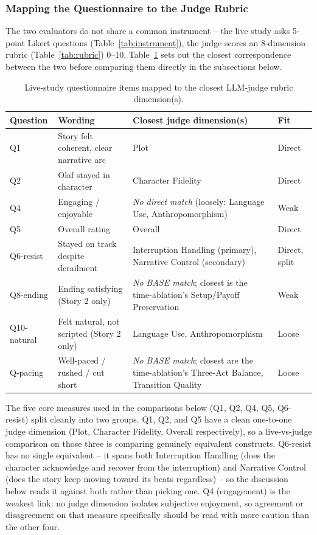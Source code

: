 \documentclass[10pt]{article}
\begin{document}
\subsubsection{Mapping the Questionnaire to the Judge Rubric}
\label{sec:llm-vs-study-mapping}

The two evaluators do not share a common instrument -- the live study asks 5-point Likert questions (Table~\ref{tab:instrument}), the judge scores an 8-dimension rubric (Table~\ref{tab:rubric}) 0--10. Table~\ref{tab:question-mapping} sets out the closest correspondence between the two before comparing them directly in the subsections below.

\begin{table}[htbp]
\centering
\caption{Live-study questionnaire items mapped to the closest LLM-judge rubric dimension(s).}
\label{tab:question-mapping}
\small
\begin{tabular}{p{2.4cm}p{5.6cm}p{4.3cm}p{1.6cm}}
\toprule
Question & Wording & Closest judge dimension(s) & Fit \\
\midrule
Q1 & Story felt coherent, clear narrative arc & Plot & Direct \\
Q2 & Olaf stayed in character & Character Fidelity & Direct \\
Q4 & Engaging / enjoyable & \emph{No direct match} (loosely: Language Use, Anthropomorphism) & Weak \\
Q5 & Overall rating & Overall & Direct \\
Q6-resist & Stayed on track despite derailment & Interruption Handling (primary), Narrative Control (secondary) & Direct, split \\
Q8-ending & Ending satisfying (Story 2 only) & \emph{No BASE match}; closest is the time-ablation's Setup/Payoff Preservation & Weak \\
Q10-natural & Felt natural, not scripted (Story 2 only) & Language Use, Anthropomorphism & Loose \\
Q-pacing & Well-paced / rushed / cut short & \emph{No BASE match}; closest are the time-ablation's Three-Act Balance, Transition Quality & Loose \\
\bottomrule
\end{tabular}
\end{table}

The five core measures used in the comparisons below (Q1, Q2, Q4, Q5, Q6-resist) split cleanly into two groups. Q1, Q2, and Q5 have a clean one-to-one judge dimension (Plot, Character Fidelity, Overall respectively), so a live-vs-judge comparison on those three is comparing genuinely equivalent constructs. Q6-resist has no single equivalent -- it spans both Interruption Handling (does the character acknowledge and recover from the interruption) and Narrative Control (does the story keep moving toward its beats regardless) -- so the discussion below reads it against both rather than picking one. Q4 (engagement) is the weakest link: no judge dimension isolates subjective enjoyment, so agreement or disagreement on that measure specifically should be read with more caution than the other four.
\end{document}

